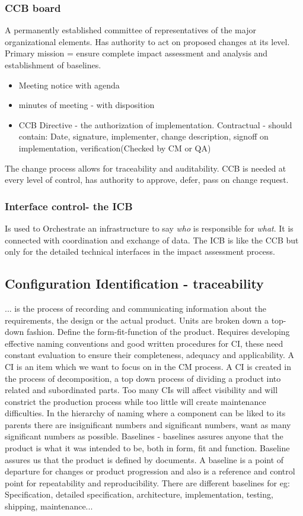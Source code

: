 \documentclass{article}
\begin{document}
\subsubsection{CCB board} A permanently established committee of representatives of the major organizational elements. Has authority to act on proposed changes at its level.
Primary mission = ensure complete impact assessment and analysis and establishment of baselines.
\begin{itemize}
    \item Meeting notice with agenda
    \item minutes of meeting - with disposition
    \item CCB Directive - the authorization of implementation. Contractual - should contain: Date, signature, implementer, change description, signoff on implementation, verification(Checked by CM or QA)
\end{itemize}
The change process allows for traceability and auditability. CCB is needed at every level of control, has authority to approve, defer, pass on change request.
\subsubsection{Interface control- the ICB}
Is used to Orchestrate an infrastructure to say \textit{who} is responsible for \textit{what}. It is connected with coordination and exchange of data.
The ICB is like the CCB but only for the detailed technical interfaces in the impact assessment process.

\subsection{Configuration Identification - traceability}
... is the process of recording and communicating information about the requirements, the design or the actual product. Units are broken down a top-down fashion.
Define the form-fit-function of the product. Requires developing effective naming conventions and good written procedures for CI, these need constant evaluation to ensure their completeness,
adequacy and applicability. A CI is an item which we want to focus on in the CM process. A CI is created in the process of decomposition, a top down process of dividing a product into related and subordinated parts.
Too many CIs will affect visibility and will constrict the production process while too little will create maintenance difficulties. In the hierarchy of naming where a component can be liked 
to its parents there are insignificant numbers and significant numbers, want as many significant numbers as possible.
Baselines - baselines assures anyone that the product is what it was intended to be, both in form, fit and function. Baseline assures us that the product is defined by documents.
A baseline is a point of departure for changes or product progression and also is a reference and control point for repeatability and reproducibility. There are different baselines for eg:
Specification, detailed specification, architecture, implementation, testing, shipping, maintenance...
\end{document}
